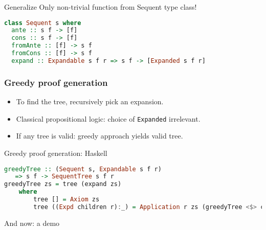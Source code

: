 \documentclass{beamer}
\begin{document}
\begin{frame}[fragile]{Generalize}
Only non-trivial function from Sequent type class!
\vspace{1em}
	    \begin{lstlisting}[language=Haskell]
class Sequent s where
  ante :: s f -> [f]
  cons :: s f -> [f]
  fromAnte :: [f] -> s f
  fromCons :: [f] -> s f
  expand :: Expandable s f r => s f -> [Expanded s f r]
    \end{lstlisting}

\end{frame}

\begin{frame}[fragile]
    \frametitle{Greedy proof generation}

    \begin{itemize}
    	\item To find the tree, recursively pick an expansion. \\
      	\pause
		\item Classical propositional logic: choice of \texttt{Expanded} irrelevant.
		\item If any tree is valid: greedy approach yields valid tree.
    \end{itemize}
\end{frame}

\begin{frame}[fragile]{Greedy proof generation: Haskell}
    \begin{lstlisting}[language=Haskell]
greedyTree :: (Sequent s, Expandable s f r)
   => s f -> SequentTree s f r
greedyTree zs = tree (expand zs)
    where
        tree [] = Axiom zs
        tree ((Expd children r):_) = Application r zs (greedyTree <$> children)
    \end{lstlisting}

\end{frame}

\begin{frame}[focus]
    And now: a demo
\end{frame}
\end{document}
